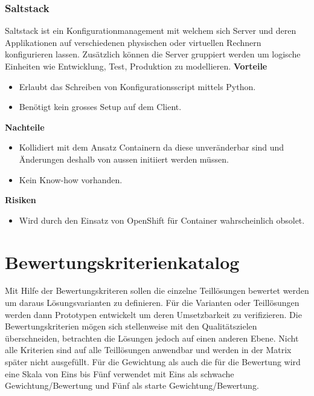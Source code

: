 \subsubsection{Saltstack}

Saltstack ist ein Konfigurationmanagement mit welchem sich Server und deren Applikationen auf verschiedenen physischen oder virtuellen Rechnern konfigurieren lassen. Zusätzlich können die Server gruppiert werden um logische Einheiten wie Entwicklung, Test, Produktion zu modellieren.\newline
\newline
\textbf{Vorteile}
\begin{itemize}
	\item Erlaubt das Schreiben von Konfigurationsscript mittels Python.
	\item Benötigt kein grosses Setup auf dem Client.
\end{itemize}
\textbf{Nachteile}
\begin{itemize}
	\item Kollidiert mit dem Ansatz Containern da diese unveränderbar sind und Änderungen deshalb von aussen initiiert werden müssen.
	\item Kein Know-how vorhanden.
\end{itemize}
\textbf{Risiken}
\begin{itemize}
	\item Wird durch den Einsatz von OpenShift für Container wahrscheinlich obsolet.
\end{itemize}

\section{Bewertungskriterienkatalog}

Mit Hilfe der Bewertungskriteren sollen die einzelne Teillösungen bewertet werden um daraus Lösungsvarianten zu definieren. Für die Varianten oder Teillösungen werden dann Prototypen entwickelt um deren Umsetzbarkeit zu verifizieren. Die Bewertungskriterien mögen sich stellenweise mit den Qualitätszielen überschneiden, betrachten die Lösungen jedoch auf einen anderen Ebene. Nicht alle Kriterien sind auf alle Teillösungen anwendbar und werden in der Matrix später nicht ausgefüllt.\newline
Für die Gewichtung als auch die für die Bewertung wird eine Skala von Eins bis Fünf verwendet mit Eins als schwache Gewichtung/Bewertung und Fünf als starte Gewichtung/Bewertung.

